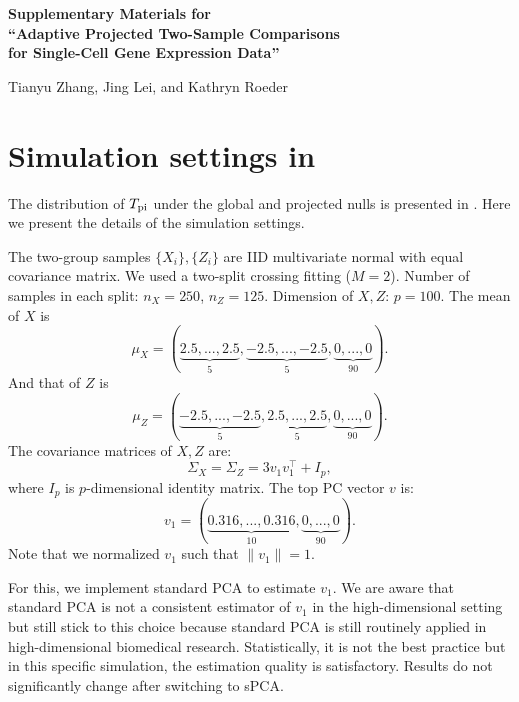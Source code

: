 \documentclass[11pt]{article}
\begin{document}
\newpage

\begin{center}
\LARGE\bfseries
Supplementary Materials for\\
``Adaptive Projected Two-Sample Comparisons\\ for Single-Cell Gene Expression Data''

\vspace{1em}

\normalsize
Tianyu Zhang, Jing Lei, and Kathryn Roeder

\end{center}

\vspace{2em}

\appendix
\renewcommand\thefigure{\thesection.\arabic{figure}}    
\section{Simulation settings in }
\label{app: for the figure}
The distribution of $T_{\rm pi}$ under the global and projected nulls is presented in . Here we present the details of the simulation settings.

The two-group samples $\{X_i\}, \{Z_i\}$ are IID multivariate normal with equal covariance matrix. We used a two-split crossing fitting ($M=2$). Number of samples in each split: $n_X = 250$, $n_Z = 125$. Dimension of $X,Z$: $p = 100$. The mean of $X$ is
\begin{equation*}
    \mu_X = (\underbrace{2.5,...,2.5}_{5}, \underbrace{-2.5,...,-2.5}_{5}, \underbrace{0,...,0}_{90}).
\end{equation*}
And that of $Z$ is 
\begin{equation*}
    \mu_Z = (\underbrace{-2.5,...,-2.5}_{5}, \underbrace{2.5,...,2.5}_{5}, \underbrace{0,...,0}_{90}).
\end{equation*}
The covariance matrices of $X,Z$ are:
\begin{equation*}
    \Sigma_X = \Sigma_Z = 3v_1v_1^\top+I_p,
\end{equation*}
where $I_p$ is $p$-dimensional identity matrix. The top PC vector $v$ is:
\begin{equation*}
    v_1 = (\underbrace{0.316, ..., 0.316}_{10},\underbrace{0,...,0}_{90}).
\end{equation*}
Note that we normalized $v_1$ such that $\|v_1\| = 1$.

For this, we implement standard PCA to estimate $v_1$. We are aware that standard PCA is not a consistent estimator of $v_1$ in the high-dimensional setting but still stick to this choice because standard PCA is still routinely applied in high-dimensional biomedical research. Statistically, it is not the best practice but in this specific simulation, the estimation quality is satisfactory. Results do not significantly change after switching to sPCA.
\end{document}
